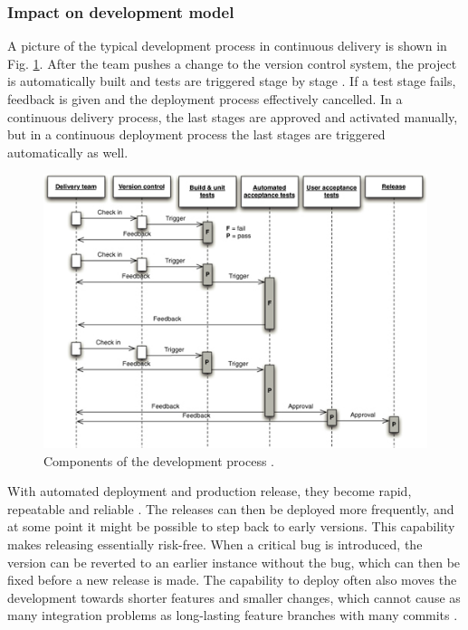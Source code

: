 \documentclass[english]{tktltiki2}
\theoremstyle{definition}
\theoremstyle{remark}
\begin{document}
\subsubsection{Impact on development model}

A picture of the typical development process in continuous delivery is shown in Fig. \ref{fig4}. After the team pushes a change to the version control system, the project is automatically built and tests are triggered stage by stage \cite{cdbook}. If a test stage fails, feedback is given and the deployment process effectively cancelled. In a continuous delivery process, the last stages are approved and activated manually, but in a continuous deployment process the last stages are triggered automatically as well.

\begin{figure}[h]
	\centering
	\includegraphics[width=5.0in]{developmentprocess.jpg}
	\caption{Components of the development process \cite{cdbook}.}
	\label{fig4}
\end{figure}

With automated deployment and production release, they become rapid, repeatable and reliable \cite{cdbook}. The releases can then be deployed more frequently, and at some point it might be possible to step back to early versions. This capability makes releasing essentially risk-free. When a critical bug is introduced, the version can be reverted to an earlier instance without the bug, which can then be fixed before a new release is made. The capability to deploy often also moves the development towards shorter features and smaller changes, which cannot cause as many integration problems as long-lasting feature branches with many commits \cite{cdbook}.
\end{document}
